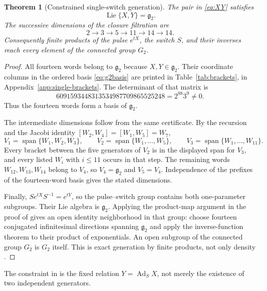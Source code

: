 \documentclass[11pt,a4paper]{article}
\newtheorem{theorem}{Theorem}[section]
\newcommand{\Lie}{\operatorname{Lie}}
\newcommand{\Ad}{\operatorname{Ad}}
\newcommand{\Span}{\operatorname{span}}
\begin{document}
\begin{theorem}[Constrained single-switch generation]
\label{thm:single}
The pair in \eqref{eq:XY} satisfies
\[
\Lie\{X,Y\}=\mathfrak g_2.
\]
The successive dimensions of the closure filtration are
\[
2\longrightarrow3\longrightarrow5\longrightarrow11\longrightarrow14\longrightarrow14.
\]
Consequently finite products of the pulse $e^{tX}$, the switch $S$, and their inverses reach every element of the connected group $G_2$.
\end{theorem}

\begin{proof}
All fourteen words belong to $\mathfrak g_2$ because $X,Y\in\mathfrak g_2$.
Their coordinate columns in the ordered basis \eqref{eq:g2basis} are printed in
Table~\ref{tab:brackets}, in Appendix~\ref{app:single-brackets}.  The determinant of that matrix is
\begin{equation}
6091593448313534987709865525248=2^{88}3^9\ne0.
\label{eq:bracketdet}
\end{equation}
Thus the fourteen words form a basis of $\mathfrak g_2$.

The intermediate dimensions follow from the same certificate.  By the recursion and the Jacobi identity
$[W_2,W_4]=[W_1,W_5]=W_7$,
\[
V_1=\Span\{W_1,W_2,W_3\},\qquad
V_2=\Span\{W_1,\ldots,W_5\},\qquad
V_3=\Span\{W_1,\ldots,W_{11}\}.
\]
Every bracket between the five generators of $V_2$ is in the displayed span for $V_3$,
and every listed $W_i$ with $i\le11$ occurs in that step.  The remaining words
$W_{12},W_{13},W_{14}$ belong to $V_4$, so $V_4=\mathfrak g_2$ and $V_5=V_4$.
Independence of the prefixes of the fourteen-word basis gives the stated dimensions.

Finally, $Se^{tX}S^{-1}=e^{tY}$, so the pulse--switch group contains both
one-parameter subgroups.  Their Lie algebra is $\mathfrak g_2$.  Applying the
product-map argument in the proof of  gives an open identity
neighborhood in that group: choose fourteen conjugated infinitesimal directions
spanning $\mathfrak g_2$ and apply the inverse-function theorem to their product of
exponentials.  An open subgroup of the connected group $G_2$ is $G_2$ itself.
This is exact generation by finite products, not only density
\cite{JurdjevicSussmann1972,SilvaLeiteCrouch1988,AgrachevSachkov2004}.
\end{proof}

The constraint in  is the fixed relation $Y=\Ad_S X$, not merely the existence of two independent generators.
\end{document}
